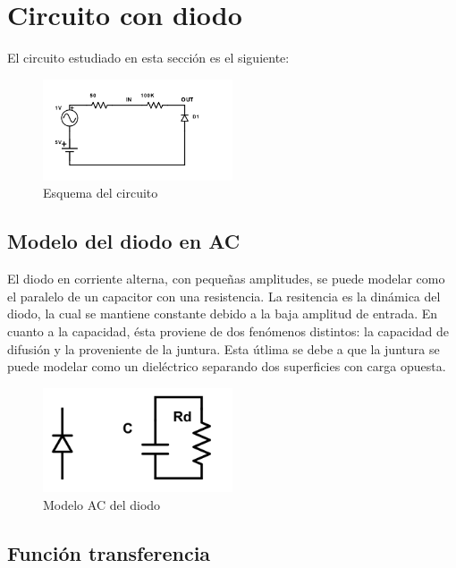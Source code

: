 \documentclass[../../e1_tp1_main.tex]{subfiles}
\begin{document}
\chapter{Circuito con diodo}

El circuito estudiado en esta secci\'on es el siguiente:

\begin{figure}[H]
\centering
\includegraphics[width=0.5\textwidth]{imagenes/cirq.png}
\caption{Esquema del circuito}
\end{figure}


\section{Modelo del diodo en AC}

El diodo en corriente alterna, con pequeñas amplitudes, se puede modelar como el paralelo de un capacitor con una resistencia. La resitencia es la din\'amica del diodo, la cual se mantiene constante debido a la baja amplitud de entrada. En cuanto a la capacidad, \'esta proviene de dos fen\'omenos distintos: la capacidad de difusi\'on y la proveniente de la juntura. Esta \'utlima se debe a que la juntura se puede modelar como un diel\'ectrico separando dos superficies con carga opuesta.

\begin{figure}[H]
\centering
\includegraphics[width=0.5\textwidth]{imagenes/modAc.png}
\caption{Modelo AC del diodo}
\end{figure}

\section{Funci\'on transferencia}
\end{document}
